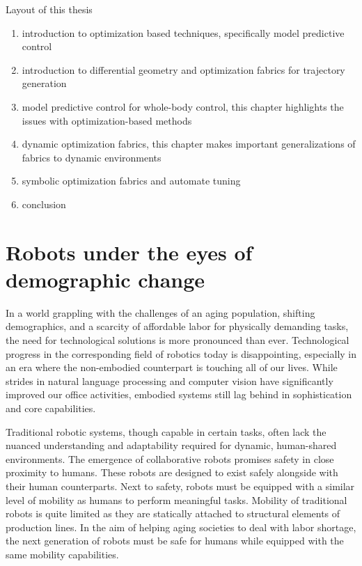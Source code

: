 Layout of this thesis
\begin{enumerate}
  \item introduction to optimization based techniques, specifically model
  predictive control
  \item introduction to differential geometry and optimization fabrics for
  trajectory generation
  \item model predictive control for whole-body control, this chapter highlights
  the issues with optimization-based methods
  \item dynamic optimization fabrics, this chapter makes important
  generalizations of fabrics to dynamic environments  
  \item symbolic optimization fabrics and automate tuning
  \item conclusion
\end{enumerate}
\fi

\section{Robots under the eyes of demographic change}

In a world grappling with the challenges of an aging
population, shifting demographics, and a scarcity of
affordable labor for physically demanding tasks, the need
for technological solutions is more pronounced than ever.
Technological progress in the corresponding field of
robotics today is disappointing, especially in an era where
the non-embodied counterpart is touching all of our lives.
While strides in natural language processing and computer
vision have significantly improved our office activities,
embodied systems still lag behind in sophistication and core
capabilities.

Traditional robotic systems, though capable in certain
tasks, often lack the nuanced understanding and adaptability
required for dynamic, human-shared environments. The
emergence of collaborative robots promises safety in close
proximity to humans. These robots are designed to exist
safely alongside with their human counterparts. Next to
safety, robots must be equipped with a similar level of
mobility as humans to perform meaningful tasks. Mobility of
traditional robots is quite limited as they are statically
attached to structural elements of production lines. In the
aim of helping aging societies to deal with labor shortage,
the next generation of robots must be safe for humans while
equipped with the same mobility capabilities.

